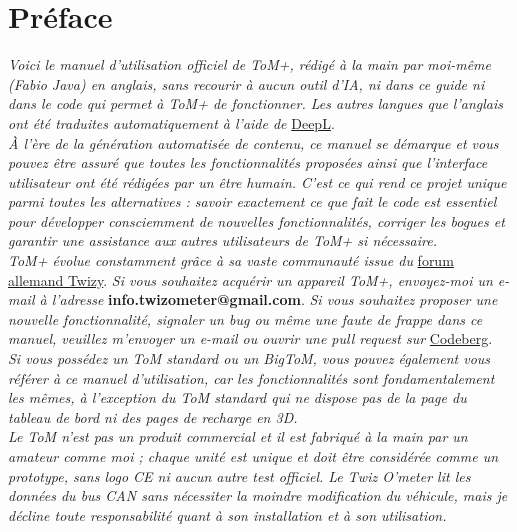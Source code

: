 \chapter*{Préface}

\textit{Voici le manuel d'utilisation officiel de ToM+, rédigé à la main par moi-même (Fabio Java) en anglais, sans recourir à
aucun outil d'IA, ni dans ce guide ni dans le code qui permet à ToM+ de fonctionner. Les autres langues
que l’anglais ont été traduites automatiquement à l’aide de} \href{https://www.deepl.com/en/translator}{DeepL}.\\

\textit{À l’ère de la génération automatisée de contenu, ce manuel se démarque et vous pouvez
être assuré que toutes les fonctionnalités proposées ainsi que l’interface utilisateur ont été rédigées par un être humain.
C’est ce qui rend ce projet unique parmi toutes les alternatives : savoir exactement
ce que fait le code est essentiel pour développer consciemment de nouvelles fonctionnalités, corriger les bogues et
garantir une assistance aux autres utilisateurs de ToM+ si nécessaire.}\\

\textit{ToM+ évolue constamment grâce à sa vaste communauté issue du
} \href{https://www.twizy-forum.de/twiz-o-meter}{forum allemand Twizy}. \textit{Si vous 
souhaitez acquérir un appareil ToM+, envoyez-moi un e-mail à l’adresse} \textbf{info.twizometer@gmail.com}.
\textit{Si vous souhaitez proposer une nouvelle fonctionnalité, signaler un bug ou même une faute de frappe dans ce
manuel, veuillez m’envoyer un e-mail ou ouvrir une pull request sur} \href{https://codeberg.org/fabio-java/ToM-Wizard}{Codeberg}.\\

\textit{Si vous possédez un ToM standard ou un BigToM, vous pouvez également vous référer à ce manuel d’utilisation,
car les fonctionnalités sont fondamentalement les mêmes, à l’exception du ToM standard qui ne dispose pas de la
page du tableau de bord ni des pages de recharge en 3D.}\\

\textit{Le ToM n'est pas un produit commercial et il est fabriqué à la main par un amateur comme moi ; chaque 
unité est unique et doit être considérée comme un prototype, sans logo CE ni aucun autre 
test officiel. Le Twiz O'meter lit les données du bus CAN sans nécessiter la moindre
modification du véhicule, mais je décline toute responsabilité quant à son installation
et à son utilisation.}\\

